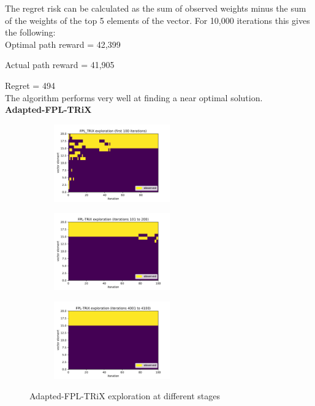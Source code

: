 The regret risk can be calculated as the sum of observed weights minus the sum of the weights of the top 5 elements of the vector. For 10,000 iterations this gives the following:\\

Optimal path reward = 42,399

Actual path reward = 41,905

Regret = 494\\

\noindent The algorithm performs very well at finding a near optimal solution.\\

\noindent \textbf{Adapted-FPL-TRiX}\\
\begin{figure}[ht!]
\centering
\begin{subfigure}{.33\textwidth}
  \centering
  \includegraphics[width=50mm]{../plots/basicFPL_100iters.pdf}
\end{subfigure}%
\begin{subfigure}{.33\textwidth}
  \centering
  \includegraphics[width=50mm]{../plots/basicFPL_100_200iters.pdf}
\end{subfigure}
\begin{subfigure}{.33\textwidth}
  \centering
  \includegraphics[width=50mm]{../plots/basicFPL_4000_4100iters.pdf}
\end{subfigure}
\caption{Adapted-FPL-TRiX exploration at different stages}
\label{fig:fpltrix_basic}
\end{figure}

